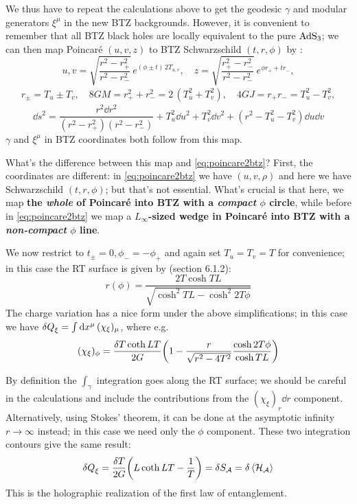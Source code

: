 \documentclass[11pt,a4paper]{article}
\begin{document}
	We thus have to repeat the calculations above to get the geodesic $\gamma$ and modular generators $\xi^\mu$ in the new BTZ backgrounds. However, it is convenient to remember that all BTZ black holes are locally equivalent to the pure $\mathrm{AdS}_3$; we can then map Poincar\'e $(u,v,z)$ to BTZ Schwarzschild $(t,r,\phi)$ by \cite{Hubeny:2007xt}:
	\begin{equation}
		u,v = \sqrt{\frac{r^2 - r_+^2}{r^2 - r_-^2}}\,
			e^{(\phi\pm t)\,2T_{u,v}},
	\quad
		z = \sqrt{\frac{r_+^2 - r_-^2}{r^2 - r_-^2}}\,
			e^{\phi r_+ + t r_-},
	\end{equation}
	\begin{gather}
		r_\pm = T_u \pm T_v,
	\quad
		8GM = r_+^2 + r_-^2
		= 2\,(T_u^2 + T_v^2),
	\quad
		4GJ = r_+ r_-
		= T_u^2 - T_v^2,
	\end{gather}
	\begin{equation}
		\dd{s}^2
		= \frac{r^2 \dd{r}^2}{
				(r^2 - r_+^2)
				(r^2 - r_-^2)
			}
			+ T_u^2 \dd{u}^2
			+ T_v^2 \dd{v}^2
			+ (r^2 - T_u^2 - T_v^2) \dd{u} \dd{v}
	\end{equation}
	$\gamma$ and $\xi^\mu$ in BTZ coordinates both follow from this map. 
	
	What's the difference between this map and \eqref{eq:poincare2btz}? First, the coordinates are different: in \eqref{eq:poincare2btz} we have $(u,v,\rho)$ and here we have Schwarzschild $(t,r,\phi)$; but that's not essential. What's crucial is that here, we map \textbf{the \textsl{whole} of Poincar\'e into BTZ with a \textsl{compact} $\phi$ circle}, while before in \eqref{eq:poincare2btz} we map a \textbf{$L_\infty$-sized wedge in Poincar\'e into BTZ with a \textsl{non-compact} $\phi$ line}. 
	
	We now restrict to $t_\pm = 0, \phi_- = -\phi_+$ and again set $T_u = T_v = T$ for convenience; in this case the RT surface is given by \textcite{Rangamani:2016dms} (section 6.1.2):
	\begin{equation}
		r(\phi) = \frac{2T\cosh TL}{
				\sqrt{\cosh^2 TL - \cosh^2 2T\phi}
			}
	\end{equation}
	The charge variation has a nice form under the above simplifications; in this case we have $
		\var{Q}_{\xi}
		= \int \dd{x^\mu} (\chi_\xi)_\mu
	$, where e.g.
	\begin{equation}
		(\chi_\xi)_\phi
		= \frac{\var{T} \coth LT}{2G}
			\pqty{
				1 - {\frac{r}{\sqrt{r^2 - 4T^2}}}
				\frac{\cosh 2T\phi}{\cosh TL}
			}
	\end{equation}
	
	By definition the $\int_\gamma$ integration goes along the RT surface; we should be careful in the calculations and include the contributions from the $(\chi_\xi)_r \dd{r}$ component. 
	Alternatively, using Stokes' theorem, it can be done at the asymptotic infinity $r\to\infty$ instead; in this case we need only the $\phi$ component. These two integration contours give the same result:
	\begin{equation}
		\var{Q}_\xi
		= \frac{\var{T}}{2G} \pqty{
				L \coth LT - \frac{1}{T}
			}
		= \var{S_\mcal{A}}
		= \var{\ave{\mcal{H}_\mcal{A}}}
	\end{equation}
	This is the holographic realization of the first law of entanglement. 
	
\end{document}
